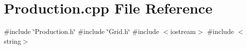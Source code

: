 \section{Production.\+cpp File Reference}
\label{Production_8cpp}
{\ttfamily \#include \char`\"{}Production.\+h\char`\"{}}\newline
{\ttfamily \#include \char`\"{}Grid.\+h\char`\"{}}\newline
{\ttfamily \#include $<$iostream$>$}\newline
{\ttfamily \#include $<$string$>$}\newline
